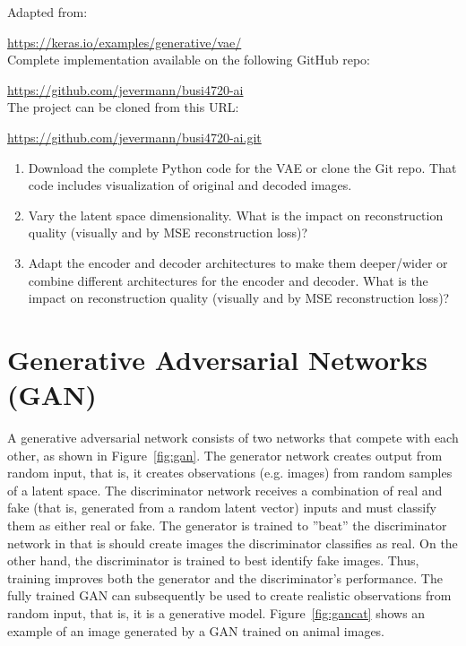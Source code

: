\begin{resourcebox}
Adapted from: 

\small\url{https://keras.io/examples/generative/vae/}\normalsize \\

Complete implementation available on the following GitHub repo:

\small\url{https://github.com/jevermann/busi4720-ai}\normalsize \\

The project can be cloned from this URL:

\small\url{https://github.com/jevermann/busi4720-ai.git}\normalsize
\end{resourcebox}


\begin{exercisebox}
\begin{enumerate}
  \item Download the complete Python code for the VAE or clone the Git repo. That code includes visualization of original and decoded images.
  \item Vary the latent space dimensionality. What is the impact on reconstruction quality (visually and by MSE reconstruction loss)?
  \item Adapt the encoder and decoder architectures to make them deeper/wider or combine different architectures for the encoder and decoder. What is the impact on reconstruction quality (visually and by MSE reconstruction loss)?
\end{enumerate}
\end{exercisebox}


\FloatBarrier

\section{Generative Adversarial Networks (GAN)}

A generative adversarial network consists of two networks that compete with each other, as shown in Figure~\ref{fig:gan}. The generator network creates output from random input, that is, it creates observations (e.g. images) from random samples of a latent space. The discriminator network receives a combination of real and fake (that is, generated from a random latent vector) inputs and must classify them as either real or fake. The generator is trained to ''beat'' the discriminator network in that is should create images the discriminator classifies as real. On the other hand, the discriminator is trained to best identify fake images. Thus, training improves both the generator and the discriminator's performance. The fully trained GAN can subsequently be used to create realistic observations from random input, that is, it is a generative model. Figure~\ref{fig:gancat} shows an example of an image generated by a GAN trained on animal images.

